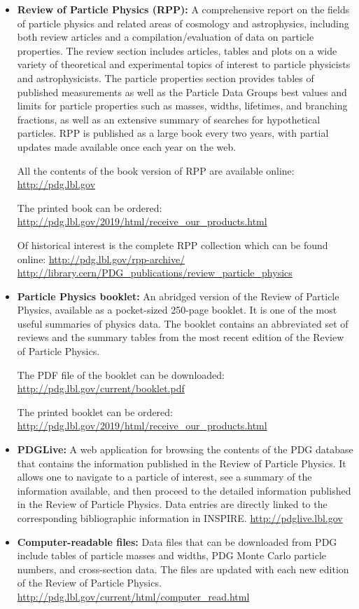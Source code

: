 \begin{itemize}
\item
  \textbf{Review of Particle Physics (RPP):} A comprehensive report on
  the fields of particle physics and related areas of cosmology and
  astrophysics, including both review articles and a
  compilation/evaluation of data on particle properties. The review
  section includes articles, tables and plots on a wide variety of
  theoretical and experimental topics of interest to particle physicists
  and astrophysicists. The particle properties section provides tables
  of published measurements as well as the Particle Data Groups best
  values and limits for particle properties such as masses, widths,
  lifetimes, and branching fractions, as well as an extensive summary of
  searches for hypothetical particles. RPP is published as a large book
  every two years, with partial updates made available once each year on
  the web.

  All the contents of the book version of RPP are available online:
  \url{http://pdg.lbl.gov}

  The printed book can be ordered:
  \url{http://pdg.lbl.gov/2019/html/receive_our_products.html}

  Of historical interest is the complete RPP collection which can be
  found online: \url{http://pdg.lbl.gov/rpp-archive/}
  \url{http://library.cern/PDG_publications/review_particle_physics}
\item
  \textbf{Particle Physics booklet:} An abridged version of the Review
  of Particle Physics, available as a pocket-sized 250-page booklet. It
  is one of the most useful summaries of physics data. The booklet
  contains an abbreviated set of reviews and the summary tables from the
  most recent edition of the Review of Particle Physics.

  The PDF file of the booklet can be downloaded:
  \url{http://pdg.lbl.gov/current/booklet.pdf}

  The printed booklet can be ordered:
  \url{http://pdg.lbl.gov/2019/html/receive_our_products.html}
\item
  \textbf{PDGLive:} A web application for browsing the contents of the
  PDG database that contains the information published in the Review of
  Particle Physics. It allows one to navigate to a particle of interest,
  see a summary of the information available, and then proceed to the
  detailed information published in the Review of Particle Physics. Data
  entries are directly linked to the corresponding bibliographic
  information in INSPIRE. \url{http://pdglive.lbl.gov}
\item
  \textbf{Computer-readable files:} Data files that can be downloaded
  from PDG include tables of particle masses and widths, PDG Monte Carlo
  particle numbers, and cross-section data. The files are updated with
  each new edition of the Review of Particle Physics.
  \url{http://pdg.lbl.gov/current/html/computer_read.html}
\end{itemize}

